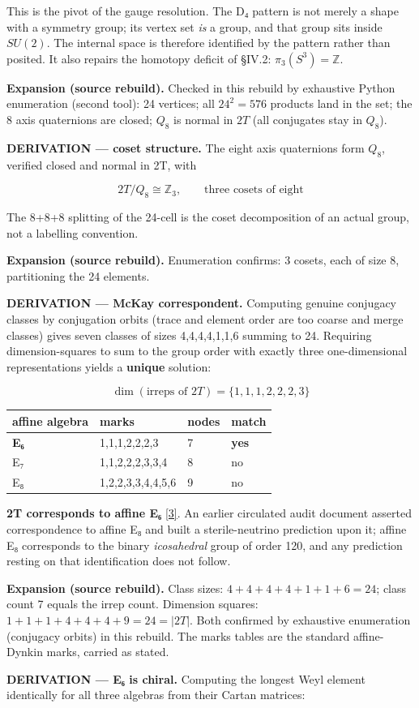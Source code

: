 \documentclass[a4paper,11pt]{article}
\newcommand{\expansion}[1]{\par\smallskip\noindent\textbf{Expansion (source rebuild).} #1\par\smallskip}
\begin{document}
This is the pivot of the gauge resolution. The D₄ pattern is not merely a shape with a symmetry group; its vertex set \textit{is} a group, and that group sits inside $SU(2)$. The internal space is therefore identified by the pattern rather than posited. It also repairs the homotopy deficit of §IV.2: $\pi_3(S^3)=\mathbb{Z}$.


\expansion{Checked in this rebuild by exhaustive Python enumeration (second tool): 24 vertices; all $24^2 = 576$ products land in the set; the 8 axis quaternions are closed; $Q_8$ is normal in $2T$ (all conjugates stay in $Q_8$).}
\textbf{DERIVATION — coset structure.} The eight axis quaternions form $Q_8$, verified closed and normal in 2T, with

\[2T/Q_8\cong\mathbb{Z}_3,\qquad\text{three cosets of eight}\]

The 8+8+8 splitting of the 24-cell is the coset decomposition of an actual group, not a labelling convention.


\expansion{Enumeration confirms: 3 cosets, each of size 8, partitioning the 24 elements.}
\textbf{DERIVATION — McKay correspondent.} Computing genuine conjugacy classes by conjugation orbits (trace and element order are too coarse and merge classes) gives seven classes of sizes 4,4,4,4,1,1,6 summing to 24. Requiring dimension-squares to sum to the group order with exactly three one-dimensional representations yields a \textbf{unique} solution:

\[\dim(\text{irreps of }2T)=\{1,1,1,2,2,2,3\}\]

\begin{center}
\begin{tabular}{llll}
\hline
affine algebra & marks & nodes & match \\
\hline
\textbf{E₆} & 1,1,1,2,2,2,3 & 7 & \textbf{yes} \\
E₇ & 1,1,2,2,2,3,3,4 & 8 & no \\
E₈ & 1,2,2,3,3,4,4,5,6 & 9 & no \\
\hline
\end{tabular}
\end{center}

\textbf{2T corresponds to affine E₆} \hyperref[ref3]{[3]}. An earlier circulated audit document asserted correspondence to affine E₈ and built a sterile-neutrino prediction upon it; affine E₈ corresponds to the binary \textit{icosahedral} group of order 120, and any prediction resting on that identification does not follow.


\expansion{Class sizes: $4+4+4+4+1+1+6 = 24$; class count 7 equals the irrep count. Dimension squares: $1+1+1+4+4+4+9 = 24 = |2T|$. Both confirmed by exhaustive enumeration (conjugacy orbits) in this rebuild. The marks tables are the standard affine-Dynkin marks, carried as stated.}
\textbf{DERIVATION — E₆ is chiral.} Computing the longest Weyl element identically for all three algebras from their Cartan matrices:
\end{document}
